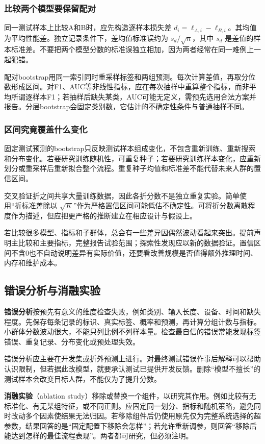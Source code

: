 \documentclass[UTF8,fontset=none,zihao=-4,a4paper]{ctexart}
\newcommand{\term}[1]{\textbf{#1}}
\numberwithin{equation}{section}
\numberwithin{figure}{section}
\begin{document}
\subsubsection{比较两个模型要保留配对}
同一测试样本上比较A和B时，应先构造逐样本损失差 $d_i=\ell_{A,i}-\ell_{B,i}$。其均值为平均性能差。独立记录条件下，差均值标准误约为 $s_d/\sqrt n$，其中 $s_d$ 是差值的样本标准差。不要把两个模型分数的标准误独立相加，因为两者经常在同一难例上一起犯错。

配对bootstrap用同一索引同时重采样标签和两组预测。每次计算差值，再取分位数形成区间。对F1、AUC等非线性指标，应在每次抽样中重算整个指标，而非平均所谓逐样本F1；若抽样后缺失某类，AUC可能无定义，需预先选用合法方案并报告。分层bootstrap会固定类别数，它估计的不确定性条件与普通抽样不同。

\subsubsection{区间究竟覆盖什么变化}
固定测试预测的bootstrap只反映测试样本组成变化，不包含重新训练、重新搜索和分布变化。若要研究训练随机性，可重复种子；若要研究训练样本变化，应重新划分或重采样后重新拟合整个流程。重复种子均值和标准差不能代替未来人群的置信区间。

交叉验证折之间共享大量训练数据，因此各折分数不是独立重复实验。简单使用“折标准差除以 $\sqrt K$”作为严格置信区间可能低估不确定性。可将折分数离散程度作为描述，但应把更严格的推断建立在相应设计与假设上。

若比较很多模型、指标和子群体，总会有一些差异因偶然波动看起来突出。提前声明主比较和主要指标，完整报告试验范围；探索性发现应以新的数据验证。置信区间不含0也不自动说明差异有实际价值，还要看改善规模是否值得额外推理时间、内存和维护成本。

\subsection{错误分析与消融实验}
\term{错误分析}按预先有意义的维度检查失败，例如类别、输入长度、设备、时间和缺失程度。先保存每条记录的标识、真实标签、概率和预测，再计算分组计数与指标。小群体分数波动很大，不能只列比例不列样本量。检查最自信的错误常能发现标签错误、重复记录、分布变化或预处理失效。

错误分析应主要在开发集或折外预测上进行。对最终测试错误作事后解释可以帮助认识限制，但若据此改模型，就要承认测试已提供开发反馈。删除“模型不擅长”的测试样本会改变目标人群，不能仅为了提升分数。

\term{消融实验}（ablation study）移除或替换一个组件，以研究其作用。例如比较有无标准化、有无某组特征，或不同正则。应固定同一划分、指标和随机策略，避免同时改动多个因素使结果无法归因。若移除组件后仍使用原先仅为完整系统选择的超参数，结果回答的是“固定配置下移除会怎样”；若允许重新调参，则回答“移除后能达到怎样的最佳流程表现”。两者都可研究，但必须注明。
\end{document}
